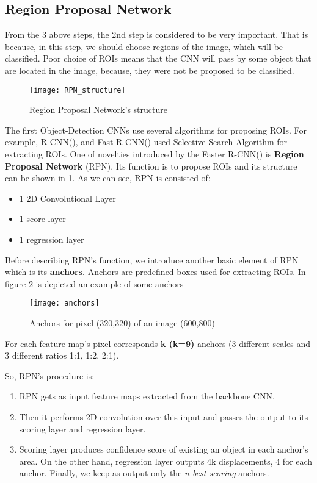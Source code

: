 \subsection{ Region Proposal Network}

From the 3 above steps, the 2nd step is considered to be very important. That is because, in this step, we should choose regions of
the image, which will be classified. Poor choice of ROIs means that the CNN will pass by some object that are located in the image,
because, they were not be proposed to be classified.

\begin{figure}[h]
  \centering
  \texttt{[image: RPN\_structure]}
  \caption{ Region Proposal Network's structure}
  \label{fig:rpn_structure}
\end{figure}

The first Object-Detection CNNs use several algorithms for proposing ROIs. For example, R-CNN(\cite{DBLP:journals/corr/GirshickDDM13}),
and Fast R-CNN(\cite{Girshick:2015:FR:2919332.2920125}) used Selective Search Algorithm for extracting ROIs.
One of novelties introduced by the Faster R-CNN(\cite{Ren:2015:FRT:2969239.2969250}) is \textbf{Region Proposal Network} (RPN). Its
function is to propose ROIs and its structure can be shown in \ref{fig:rpn_structure}. As we can see, RPN is consisted of:
\begin{itemize}
\item 1 2D Convolutional Layer
\item 1 score layer 
\item 1 regression layer
\end{itemize}

Before describing RPN's function, we introduce another basic element of RPN which is its \textbf{anchors}. Anchors are predefined boxes used for extracting ROIs. In figure \ref{fig:anchors} is
depicted an example of some anchors
\begin{figure}[h]
  \centering
  \texttt{[image: anchors]}
  \caption{ Anchors for pixel (320,320) of an image (600,800) }
  \label{fig:anchors}
\end{figure}

For each feature map's pixel corresponds \textbf{k (k=9)} anchors (3 different scales and 3 different ratios 1:1, 1:2, 2:1). \par
So, RPN's procedure is:
\begin{enumerate}
\item RPN gets as input feature maps extracted from the backbone CNN.
\item Then it performs 2D convolution over this input and passes the output to its scoring layer and regression layer.
\item Scoring layer produces confidence score of existing an object in each anchor's area. On the other hand, regression layer outputs 4k displacements, 4 for each anchor. Finally, we keep as output only the \textit{ n-best scoring} anchors.
\end{enumerate}

